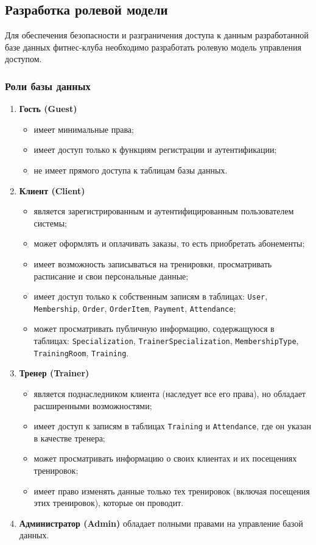 \subsection{Разработка ролевой модели}

Для обеспечения безопасности и разграничения доступа к данным разработанной базе данных фитнес-клуба необходимо разработать ролевую модель управления доступом.

\subsubsection*{Роли базы данных}

\begin{enumerate}[label=\arabic*.]
	\item \textbf{Гость (Guest)}
	\begin{itemize}
		\item имеет минимальные права;
		\item имеет доступ только к функциям регистрации и аутентификации;
		\item не имеет прямого доступа к таблицам базы данных.
	\end{itemize}
	
	\item \textbf{Клиент (Client)}
	\begin{itemize}
		\item является зарегистрированным и аутентифицированным пользователем системы;
		\item может оформлять и оплачивать заказы, то есть приобретать абонементы;
		\item имеет возможность записываться на тренировки, просматривать расписание и свои персональные данные;
		\item имеет доступ только к собственным записям в таблицах: \texttt{User}, \texttt{Membership}, \texttt{Order}, \texttt{OrderItem}, \texttt{Payment}, \texttt{Attendance};
		\item может просматривать публичную информацию, содержащуюся в таблицах: \texttt{Specialization}, \texttt{TrainerSpecialization}, \texttt{MembershipType}, \texttt{TrainingRoom}, \texttt{Training}.
	\end{itemize}
	
	\item \textbf{Тренер (Trainer)}
	\begin{itemize}
		\item является поднаследником клиента (наследует все его права), но обладает расширенными возможностями;
		\item имеет доступ к записям в таблицах \texttt{Training} и \texttt{Attendance}, где он указан в качестве тренера;
		\item может просматривать информацию о своих клиентах и их посещениях тренировок;
		\item имеет право изменять данные только тех тренировок (включая посещения этих тренировок), которые он проводит.
	\end{itemize}
	
	\item \textbf{Администратор (Admin)} обладает полными правами на управление базой данных.
\end{enumerate}

